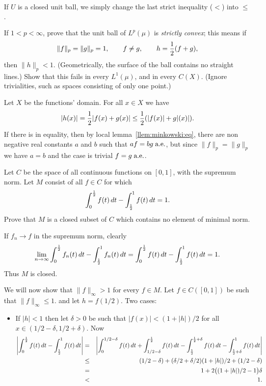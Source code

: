 \begin{enumerate}
If $U$ is a closed unit ball,
we simply change the last strict inequality ($<$) into \(\leq\).


\begin{excopy}
If \(1<p<\infty\), prove that the unit ball
of \(L^p(\mu)\) is
\emph{strictly convex};
this means if
\[ \|f\|_p = \|g\|_p = 1, \qquad f\neq g, \qquad h = \frac{1}{2}(f+g), \]
then \(\|h\|_p < 1\).
(Geometrically, the surface of the ball contains no straight lines.)
Show that this fails in every \(L^1(\mu)\), and in every \(C(X)\).
(Ignore trivialities, such as spaces consisting of only one point.)
\end{excopy}

Let $X$ be the functions' domain.
For all \(x\in X\) we have
\[|h(x)| = \frac{1}{2}|f(x)+g(x)| \leq \frac{1}{2}(|f(x)|+g|(x)|).\]
If there is in equality, then by local lemma~\ref{llem:minkowski:eq},
there are non negative real constants $a$ and $b$ such that
\(af=bg\;\textrm{a.e.}\), but since \(\|f\|_p = \|g\|_p\)
we have \(a=b\) and the case is trivial \(f=g\;\textrm{a.e.}\).


\begin{excopy}
Let $C$ be the space of all continuous functions on \([0,1]\),
with the supremum norm.
Let $M$ consist of all \(f\in C\) for which
\[ \int_0^{\frac{1}{2}} f(t)\,dt - \int_{\frac{1}{2}}^1 f(t)\,dt = 1. \]
Prove that $M$ is a closed subset of $C$ which contains no element
of minimal norm.
\end{excopy}

If \(f_n\to f\) in the supremum norm, clearly
\[ \lim_{n\to \infty} \int_0^{\frac{1}{2}} f_n(t)\,dt - \int_{\frac{1}{2}}^1 f_n(t)\,dt =
                      \int_0^{\frac{1}{2}} f(t)\,dt - \int_{\frac{1}{2}}^1 f(t)\,dt = 1. \]
Thus $M$ is closed.

We will now show that \(\|f\|_\infty > 1\) for every \(f\in M\).
Let \(f\in C([0,1])\) be such that \(\|f\|_\infty \leq 1\).
and let \(h=f(1/2)\).
Two cases:
\begin{itemize}
\item
If \(|h|<1\) then let \(\delta>0\) be such that \(|f(x)|<(1+|h|)/2\)
for all \(x\in (1/2-\delta,1/2+\delta)\). Now
\begin{eqnarray*}
\left|\int_0^{\frac{1}{2}} f(t)\,dt - \int_{\frac{1}{2}}^1 f(t)\,dt\right|
&=&
\left|\int_0^{1/2-\delta} f(t)\,dt
+ \int_{1/2-\delta}^{\frac{1}{2}} f(t)\,dt
- \int_{\frac{1}{2}}^{\frac{1}{2}+\delta} f(t)\,dt
- \int_{\frac{1}{2}+\delta}^1 f(t)\,dt\right| \\
&\leq& (1/2-\delta) + (\delta/2 + \delta/2)(1+|h|)/2 + (1/2 - \delta) \\
&=& 1 + 2\bigl((1+|h|)/2 - 1\bigr)\delta \\
&<& 1.
\end{eqnarray*}


\end{itemize}
\end{enumerate}
